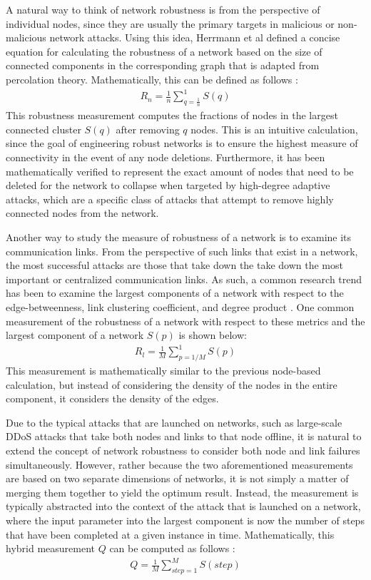 \documentclass[11pt]{article}
\begin{document}
A natural way to think of network robustness is from the perspective of individual nodes, since they are 
usually the primary targets in malicious or non-malicious network attacks. Using this idea, Herrmann et al
defined a concise equation for calculating the robustness of a network based on the size of connected
components in the corresponding graph that is adapted from percolation theory. Mathematically, this can be defined as follows \cite{Onion}:
\begin{eqnarray*}
R_{n} = \frac{1}{n}\sum_{q=\frac{1}{n}}^{1}S(q)
\end{eqnarray*}
This robustness measurement computes the fractions of nodes in the largest connected cluster $S(q)$ after removing $q$ nodes. This is an intuitive calculation, since the goal of engineering robust networks is to ensure the highest measure of connectivity in the event of any node deletions. Furthermore, it has been mathematically verified to represent the exact amount of nodes that need to be deleted for the network to collapse when targeted by high-degree adaptive attacks, which are a specific class of attacks that attempt to remove highly connected nodes from the network. 


Another way to study the measure of robustness of a network is to examine its communication links. From the perspective of such links that exist in a network, the most successful attacks are those that take down the take down the most important or centralized communication links. As such, a common research trend has been to examine the largest components of a network with respect to the edge-betweenness, link clustering coefficient, and degree product \cite{NRMalicious}. One common measurement of the robustness of a network with respect to these metrics and the largest component of a network $S(p)$ is shown below:
\begin{eqnarray*}
R_l = \frac{1}{M}\sum_{p = 1/M}^{1}S(p)
\end{eqnarray*}
This measurement is mathematically similar to the previous node-based calculation, but instead of considering the density of the nodes in the entire component, it considers the density of the edges. 

Due to the typical attacks that are launched on networks, such as large-scale DDoS attacks that take both nodes and links to that node offline, it is natural to extend the concept of network robustness to consider both node and link failures simultaneously. However, rather because the two aforementioned measurements are based on two separate dimensions of networks, it is not simply a matter of merging them together to yield the optimum result. Instead, the measurement is typically abstracted into the context of the attack that is launched on a network, where the input parameter into the largest component is now the number of steps that have been completed at a given instance in time. Mathematically, this hybrid measurement $Q$ can be computed as follows \cite{NRMalicious}:
\begin{eqnarray*}
Q = \frac{1}{M}\sum_{step  = 1}^{M}S(step)
\end{eqnarray*}
\end{document}
